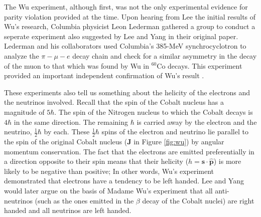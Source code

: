 \documentclass[a4paper,12pt]{book}
\begin{document}
The Wu experiment, although first, was not the only experimental evidence for parity violation provided at the time. Upon hearing from Lee the initial results of Wu's research, Columbia physicist Leon Lederman gathered a group to conduct a seperate experiment also suggested by Lee and Yang in their original paper. Lederman and his collaborators used Columbia's 385-MeV synchrocyclotron to analyze the $\pi-\mu-e$ decay chain and check for a similar asymmetry in the decay of the muon to that which was found by Wu in $^{60}$Co decays. This experiment provided an important independent confirmation of Wu's result \cite{lederman}.

These experiments also tell us something about the helicity of the electrons and the neutrinos involved. Recall that the spin of the Cobalt nucleus has a magnitude of $5\hbar$. The spin of the Nitrogen nucleus to which the Cobalt decays is $4\hbar$ in the same direction. The remaining $\hbar$ is carried away by the electron and the neutrino, $\frac{1}{2}\hbar$ by each. These $\frac{1}{2}\hbar$ spins of the electron and neutrino lie parallel to the spin of the original Cobalt nucleus ($\mathbf{J}$ in Figure \ref{fig:wu}) by angular momentum conservation. The fact that the electrons are emitted preferentially in a direction opposite to their spin means that their helicity ($h=\mathbf{s}\cdot \hat{\mathbf{p}}$) is more likely to be negative than positive; In other words, Wu's experiment demonstrated that electrons have a tendency to be left handed. Lee and Yang would later argue on the basis of Madame Wu's experiment that all anti-neutrinos (such as the ones emitted in the $\beta$ decay of the Cobalt nuclei) are right handed and all neutrinos are left handed.
\end{document}
